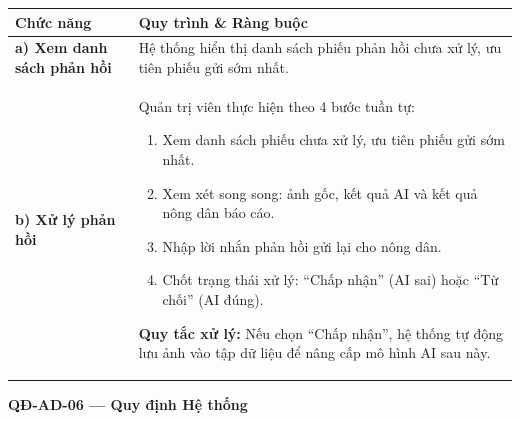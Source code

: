 \documentclass[12pt,a4paper]{article}
\begin{document}
\begin{longtable}{|
        >{\raggedright\arraybackslash}p{2.8cm}|
        >{\raggedright\arraybackslash}p{12cm}|}
    \hline
    \rowcolor{headerblue}
    \textbf{Chức năng}                 & \textbf{Quy trình \& Ràng buộc}                                                     \\
    \hline
    \endhead
    \textbf{a) Xem danh sách phản hồi} &
    Hệ thống hiển thị danh sách phiếu phản hồi chưa xử lý, ưu tiên phiếu gửi sớm nhất.                                       \\
    \hline
    \textbf{b) Xử lý phản hồi}         &
    Quản trị viên thực hiện theo 4 bước tuần tự:
    \begin{enumerate}[leftmargin=*,topsep=2pt,itemsep=1pt]
        \item Xem danh sách phiếu chưa xử lý, ưu tiên phiếu gửi sớm nhất.
        \item Xem xét song song: ảnh gốc, kết quả AI và kết quả nông dân báo cáo.
        \item Nhập lời nhắn phản hồi gửi lại cho nông dân.
        \item Chốt trạng thái xử lý: ``Chấp nhận'' (AI sai) hoặc ``Từ chối'' (AI đúng).
    \end{enumerate}
    \textbf{Quy tắc xử lý:} Nếu chọn ``Chấp nhận'', hệ thống tự động lưu ảnh vào tập dữ liệu để nâng cấp mô hình AI sau này. \\
    \hline
\end{longtable}

\vspace{0.3cm}
\noindent\textbf{QĐ-AD-06 --- Quy định Hệ thống}
\end{document}
